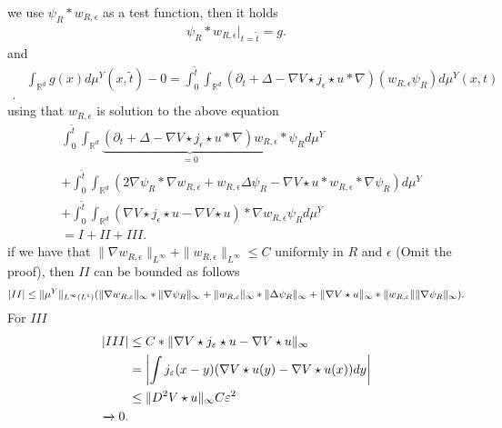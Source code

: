 we use $\psi_R * w_{R,\epsilon}$ as a test function, then it holds
\begin{align*}
  \psi_{R}*w_{R,\epsilon} \rvert_{t = \tilde{t} } = g
.\end{align*}
and 
\begin{align*}
  &\int_{\mathbb{R}^{d} } g(x)d\mu^{Y}(x,\tilde{t} ) - 0 = \int_0^{\tilde{t} } \int_{\mathbb{R}^{d} }  (\partial_t  + \Delta -  \nabla V \star  j_{\epsilon} \star u * \nabla)(w_{R,\epsilon} \psi_R) d\mu^Y(x,t)\\
.\end{align*}
using that $w_{R,\epsilon}$ is solution to the above equation 
\begin{align*}
  &\int_{0}^{\tilde{t} } \int_{\mathbb{R}^{d} } \underbrace{(\partial_t  + \Delta -  \nabla V \star j_{\epsilon} \star u * \nabla) w_{R,\epsilon}}_{=0}*\psi_{R} d\mu^Y \\
  &+  \int_0^{\tilde{t} } \int_{\mathbb{R}^{d} } (2 \nabla \psi_R * \nabla w_{R,\epsilon} + w_{R,\epsilon} \Delta \psi_{R} - \nabla V \star  u *w_{R,\epsilon}*\nabla \psi_{R}) d\mu^Y \\
  &+ \int_0^{\tilde{t} } \int_{\mathbb{R}^{d} }  (\nabla V \star  j_{\epsilon} \star  u - \nabla V \star  u) * \nabla w_{R,\epsilon}\psi_{R} d\mu^Y\\
  &= I + II + III
.\end{align*}
if we have that $\|\nabla w_{R,\epsilon}\|_{L^{\infty} } + \|w_{R,\epsilon}\|_{L^{\infty} } \le  C$ uniformly in $R$ and $\epsilon$ (Omit the proof),
then $II$ can be bounded as follows
\begin{align*}
  \abs{II}\le \|\mu^Y\|_{L^{\infty}(L^{1} ) } (\|\nabla w_{R,\epsilon}\|_{\infty}*\|\nabla \psi_R\|_{\infty}+\|w_{R,\epsilon}\|_{\infty}*\|\Delta  \psi_R\|_{\infty} +\|\nabla V \star  u\|_{\infty} * \|w_{R,\epsilon}\|\|\nabla \psi_R\|_{\infty})
.\end{align*}
For $III$ 
\begin{align*}
  \abs{III}&\le C*\|\nabla V \star  j_{\epsilon} \star u - \nabla V \star  u \|_{\infty} \\
           &= \abs*{\int j_{\epsilon}(x-y)(\nabla V \star  u (y) - \nabla V \star  u(x)) dy}\\
           &\le  \|D^2 V \star  u \|_{\infty} C \epsilon ^2 \\
           \xrightarrow{} 0
.\end{align*}

